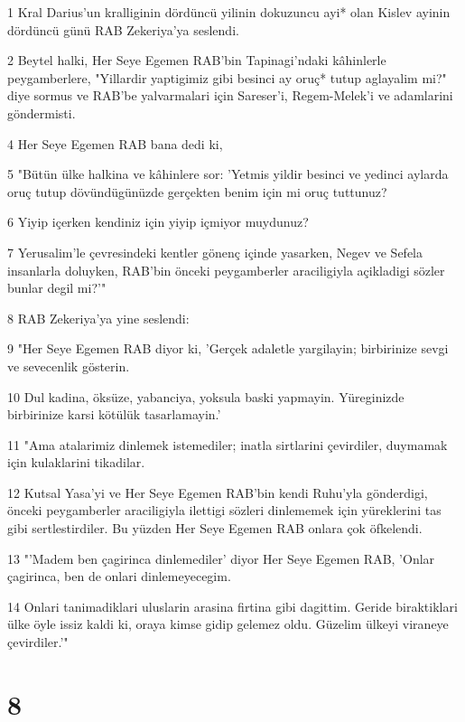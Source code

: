 \par 1 Kral Darius'un kralliginin dördüncü yilinin dokuzuncu ayi* olan Kislev ayinin dördüncü günü RAB Zekeriya'ya seslendi.
\par 2 Beytel halki, Her Seye Egemen RAB'bin Tapinagi'ndaki kâhinlerle peygamberlere, "Yillardir yaptigimiz gibi besinci ay oruç* tutup aglayalim mi?" diye sormus ve RAB'be yalvarmalari için Sareser'i, Regem-Melek'i ve adamlarini göndermisti.
\par 4 Her Seye Egemen RAB bana dedi ki,
\par 5 "Bütün ülke halkina ve kâhinlere sor: 'Yetmis yildir besinci ve yedinci aylarda oruç tutup dövündügünüzde gerçekten benim için mi oruç tuttunuz?
\par 6 Yiyip içerken kendiniz için yiyip içmiyor muydunuz?
\par 7 Yerusalim'le çevresindeki kentler gönenç içinde yasarken, Negev ve Sefela insanlarla doluyken, RAB'bin önceki peygamberler araciligiyla açikladigi sözler bunlar degil mi?'"
\par 8 RAB Zekeriya'ya yine seslendi:
\par 9 "Her Seye Egemen RAB diyor ki, 'Gerçek adaletle yargilayin; birbirinize sevgi ve sevecenlik gösterin.
\par 10 Dul kadina, öksüze, yabanciya, yoksula baski yapmayin. Yüreginizde birbirinize karsi kötülük tasarlamayin.'
\par 11 "Ama atalarimiz dinlemek istemediler; inatla sirtlarini çevirdiler, duymamak için kulaklarini tikadilar.
\par 12 Kutsal Yasa'yi ve Her Seye Egemen RAB'bin kendi Ruhu'yla gönderdigi, önceki peygamberler araciligiyla ilettigi sözleri dinlememek için yüreklerini tas gibi sertlestirdiler. Bu yüzden Her Seye Egemen RAB onlara çok öfkelendi.
\par 13 "'Madem ben çagirinca dinlemediler' diyor Her Seye Egemen RAB, 'Onlar çagirinca, ben de onlari dinlemeyecegim.
\par 14 Onlari tanimadiklari uluslarin arasina firtina gibi dagittim. Geride biraktiklari ülke öyle issiz kaldi ki, oraya kimse gidip gelemez oldu. Güzelim ülkeyi viraneye çevirdiler.'"

\chapter{8}

